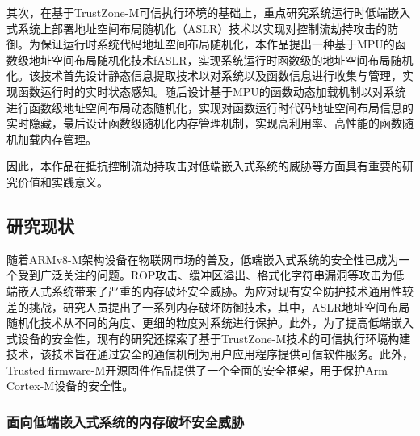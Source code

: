 \documentclass[12pt,a4paper]{ctexart}
\numberwithin{figure}{section}
\begin{document}
\par 其次，在基于TrustZone-M可信执行环境的基础上，重点研究系统运行时低端嵌入式系统上部署地址空间布局随机化（ASLR）技术以实现对控制流劫持攻击的防御。为保证运行时系统代码地址空间布局随机化，本作品提出一种基于MPU的函数级地址空间布局随机化技术fASLR，实现系统运行时函数级的地址空间布局随机化。该技术首先设计静态信息提取技术以对系统以及函数信息进行收集与管理，实现函数运行时的实时状态感知。随后设计基于MPU的函数动态加载机制以对系统进行函数级地址空间布局动态随机化，实现对函数运行时代码地址空间布局信息的实时隐藏，最后设计函数级随机化内存管理机制，实现高利用率、高性能的函数随机加载内存管理。

\par 因此，本作品在抵抗控制流劫持攻击对低端嵌入式系统的威胁等方面具有重要的研究价值和实践意义。


\subsection{研究现状}
\par 随着ARMv8-M架构设备在物联网市场的普及，低端嵌入式系统的安全性已成为一个受到广泛关注的问题。ROP攻击、缓冲区溢出、格式化字符串漏洞等攻击为低端嵌入式系统带来了严重的内存破坏安全威胁。为应对现有安全防护技术通用性较差的挑战，研究人员提出了一系列内存破坏防御技术，其中，ASLR地址空间布局随机化技术从不同的角度、更细的粒度对系统进行保护。此外，为了提高低端嵌入式设备的安全性，现有的研究还探索了基于TrustZone-M技术的可信执行环境构建技术，该技术旨在通过安全的通信机制为用户应用程序提供可信软件服务。此外，Trusted firmware-M开源固件作品提供了一个全面的安全框架，用于保护Arm Cortex-M设备的安全性。

\subsubsection{面向低端嵌入式系统的内存破坏安全威胁}
\end{document}
